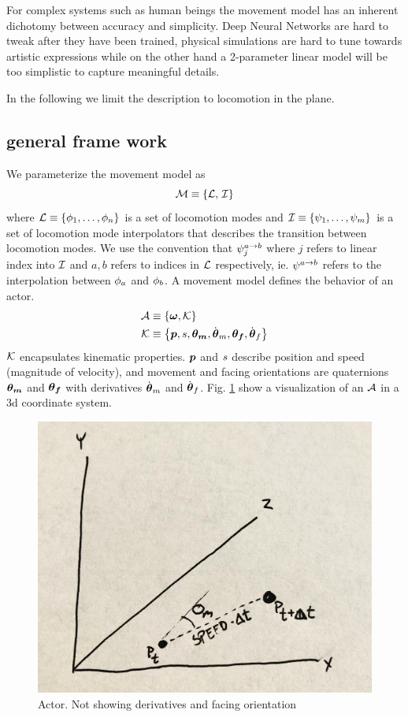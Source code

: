 For complex systems such as human beings the movement model has an inherent dichotomy between accuracy and simplicity. Deep Neural Networks are hard to tweak after they have been trained, physical simulations are hard to tune towards artistic expressions while on the other hand a 2-parameter linear model will be too simplistic to capture meaningful details.


In the following we limit  the description to locomotion in the plane. 
\subsection{general frame work}
We parameterize the movement model as 
\begin{equation}
    \label{eq:model:parameterization}
 \mathcal{M} \equiv 
 \left\{ \mathcal{L},\,\mathcal{I} \right\}
\end{equation}
where $\mathcal{L} \equiv \left\{  \phi_1, \ldots, \phi_n \right\}$ is a set of locomotion modes and $\mathcal{I} \equiv \left\{  \psi_1, \ldots, \psi_m \right\}$ is a set of locomotion mode interpolators that describes the transition between locomotion modes. We use the convention that $\psi_j^{a\rightarrow b}$ where $j$ refers to linear index into $\mathcal{I}$ and $a,b$ refers to indices in $\mathcal{L}$ respectively, ie. $\psi^{a\rightarrow b}$ refers to the interpolation between $\phi_a$ and $\phi_b$. A movement model defines the behavior of an actor. 
\begin{subequations}
\begin{align}
    \label{eq:actor:def}
    \mathcal{A} 
    &\equiv
    \left\{ 
        \boldsymbol{\omega }, \mathcal{K} 
         \right\}\\
    \mathcal{K}
    &\equiv
    \left\{ 
        \boldsymbol{p }, s, \boldsymbol{\theta_m }, \dot{\boldsymbol{\theta }}_m, {\boldsymbol{\theta_f }}, \dot{\boldsymbol{\theta }}_f 
         \right\}
\end{align}
\end{subequations}
$\mathcal{K}$ encapsulates kinematic properties. $\boldsymbol{p }$ and $s$ describe position and speed (magnitude of velocity), and movement and facing orientations are quaternions $\boldsymbol{\theta_m }$ and ${\boldsymbol{\theta_f }}$ with derivatives $\dot{\boldsymbol{\theta }}_m$ and $\dot{\boldsymbol{\theta }}_f$. Fig. \ref{fig:actor} show a visualization of an $\mathcal{A}$ in a 3d coordinate system.  
\begin{figure}
    \centering
    \includegraphics[width=0.75\columnwidth]{img/actor.jpg}
    \caption{Actor. Not showing derivatives and facing orientation}
    \label{fig:actor}
\end{figure}
